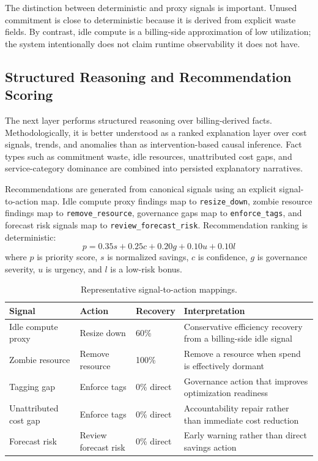 The distinction between deterministic and proxy signals is important. Unused commitment is close to deterministic because it is derived from explicit waste fields. By contrast, idle compute is a billing-side approximation of low utilization; the system intentionally does not claim runtime observability it does not have.

\subsection{Structured Reasoning and Recommendation Scoring}
The next layer performs structured reasoning over billing-derived facts. Methodologically, it is better understood as a ranked explanation layer over cost signals, trends, and anomalies than as intervention-based causal inference. Fact types such as commitment waste, idle resources, unattributed cost gaps, and service-category dominance are combined into persisted explanatory narratives.

Recommendations are generated from canonical signals using an explicit signal-to-action map. Idle compute proxy findings map to \texttt{resize\_down}, zombie resource findings map to \texttt{remove\_resource}, governance gaps map to \texttt{enforce\_tags}, and forecast risk signals map to \texttt{review\_forecast\_risk}. Recommendation ranking is deterministic:
\begin{equation}
p = 0.35s + 0.25c + 0.20g + 0.10u + 0.10l
\end{equation}
where $p$ is priority score, $s$ is normalized savings, $c$ is confidence, $g$ is governance severity, $u$ is urgency, and $l$ is a low-risk bonus.

\begin{table}[t]
\caption{Representative signal-to-action mappings.}
\label{tab:signal-action}
\centering
\footnotesize
\begin{tabularx}{\columnwidth}{p{} p{} p{} Y}
\toprule
\textbf{Signal} & \textbf{Action} & \textbf{Recovery} & \textbf{Interpretation} \\
\midrule
Idle compute proxy & Resize down & 60\% & Conservative efficiency recovery from a billing-side idle signal \\
Zombie resource & Remove resource & 100\% & Remove a resource when spend is effectively dormant \\
Tagging gap & Enforce tags & 0\% direct & Governance action that improves optimization readiness \\
Unattributed cost gap & Enforce tags & 0\% direct & Accountability repair rather than immediate cost reduction \\
Forecast risk & Review forecast risk & 0\% direct & Early warning rather than direct savings action \\
\bottomrule
\end{tabularx}
\end{table}


